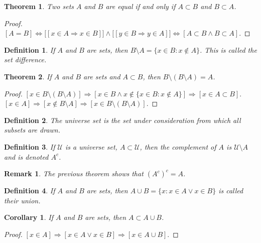 \documentclass[oneside]{book}
\theoremstyle{mystyle}
\newtheorem{theorem}{Theorem}[section]
\newtheorem{definition}{Definition}[section]
\newtheorem{corollary}{Corollary}[section]
\newtheorem{remark}{Remark}[section]
\begin{document}
\begin{theorem}
Two sets $A$ and $B$ are equal if and only if $A\subset B$ and $B\subset A$.
\end{theorem}
\begin{proof}
$[A=B]\Leftrightarrow\big[[x\in A \Rightarrow x\in B]\big]\land \big[[y\in B \Rightarrow y\in A]\big]\Leftrightarrow [A\subset B\land B\subset A]$. 
\end{proof}

\begin{definition}
If $A$ and $B$ are sets, then $B\setminus A = \{x\in B:x\notin A\}$. This is called the set difference.
\end{definition}

\begin{theorem}
If $A$ and $B$ are sets and $A\subset B$, then $B\setminus(B\setminus A)=A$.
\end{theorem}
\begin{proof}
$[x\in B\setminus(B\setminus A)]\Rightarrow [x\in B \land x\notin \{x\in B:x\notin A\}]\Rightarrow [x\in A\subset B]$. $[x\in A]\Rightarrow [x\notin B\setminus A]\Rightarrow [x\in B\setminus(B\setminus A)]$.
\end{proof}

\begin{definition}
The universe set is the set under consideration from which all subsets are drawn.
\end{definition}

\begin{definition}
If $\mathcal{U}$ is a universe set, $A\subset \mathcal{U}$, then the complement of $A$ is $\mathcal{U}\setminus A$ and is denoted $A^c$.
\end{definition}

\begin{remark}
The previous theorem shows that $(A^c)^c = A$.
\end{remark}

\begin{definition}
If $A$ and $B$ are sets, then $A\cup B = \{x: x\in A \lor x\in B\}$ is called their union.
\end{definition}

\begin{corollary}
If $A$ and $B$ are sets, then $A\subset A\cup B$.
\end{corollary}
\begin{proof}
$[x\in A]\Rightarrow [x\in A\lor x\in B]\Rightarrow [x\in A\cup B]$.
\end{proof}
\end{document}
